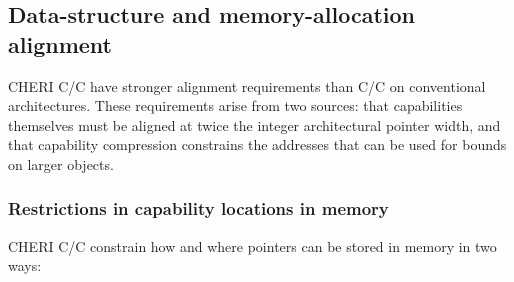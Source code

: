 \documentclass[12pt,twoside,openright,usletter]{article}
\newcommand{\note}[2]{{\color{blue}[ Note: #1 - #2]}}
\renewcommand{\note}[2]{\relax\ifhmode\unskip\fi}
\newcommand{\amnote}[1]{\note{#1}{Alfredo M.}}
\newcommand*{\cpp}[1][]{C\textsmaller[2]{\nolinebreak[4]\hspace{-.05em}\raisebox{.45ex}{\textbf{++}}}}
\begin{document}
\subsection{Data-structure and memory-allocation alignment}

CHERI C/\cpp{} have stronger alignment requirements than C/\cpp{} on conventional
architectures.
These requirements arise from two sources: that capabilities themselves must
be aligned at twice the integer architectural pointer width, and that
capability compression constrains the addresses that can be used for bounds
on larger objects.
\amnote{Is is worth mentioning compiler flags to warn on excessive padding?
  In particular it seems that it is often the case that the ordering of
  struct elements that was devised for 32bit and 64bit architectures does
  not help much to avoid extra padding with capabilities. It more or less
  depends on how much the pointers are scattered in the struct definition.}

\subsubsection{Restrictions in capability locations in memory}
\label{sec:restricted-capability-locations}

CHERI C/\cpp{} constrain how and where pointers can be stored in memory in two
ways:
\end{document}
